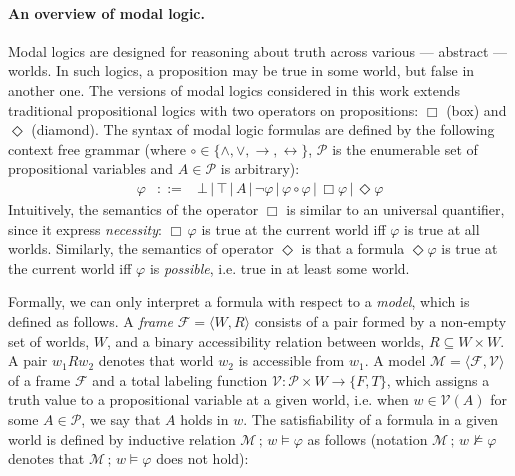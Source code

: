 \documentclass[sigconf]{acmart}
\begin{document}
\paragraph{An overview of modal logic.} Modal logics are designed for reasoning
about truth across various --- abstract --- worlds. In such logics, a
proposition may be true in some world, but false in another one. The versions of
modal logics considered in this work extends traditional propositional logics
with two operators on propositions: $\Box$ (box) and $\Diamond$ (diamond).
The syntax of modal logic formulas are defined by the following context free
grammar (where $\circ \in\{\land,\lor,\to,\leftrightarrow\}$, $\mathcal{P}$ is
the enumerable set of propositional variables and $A\in\mathcal{P}$ is arbitrary):
\[
  \begin{array}{lcl}
    \varphi & ::= & \bot\,|\,\top\,|\,A\,|\,\neg\varphi\,|\,\varphi\circ\varphi\,|\,\Box\varphi\,|\,\Diamond\varphi
  \end{array}  
\]
Intuitively, the semantics of the operator $\Box$ is similar to an universal
quantifier, since it express \emph{necessity}: $\Box\,\varphi$ is true at the
current world iff $\varphi$ is true at all worlds. Similarly, the semantics of operator
$\Diamond$ is that a formula $\Diamond\varphi$ is true at the current
world iff $\varphi$ is \emph{possible}, i.e. true in at least some world.

Formally, we can only interpret a formula with respect to a \emph{model}, which is
defined as follows.
A \emph{frame} $\mathcal{F} = \langle W, R \rangle$ consists of a pair formed by
a non-empty set of worlds, $W$, and a binary accessibility relation between
worlds, $R \subseteq W \times W$. A pair $w_1Rw_2$ denotes that world $w_2$ is
accessible from $w_1$. A model $\mathcal{M} = \langle \mathcal{F}, \mathcal{V} \rangle$
of a frame $\mathcal{F}$ and a total labeling function
$\mathcal{V} : \mathcal{P}\times W\to \{F,T\}$, which assigns
a truth value to a propositional variable at a given world, i.e. when $w \in \mathcal{V}(A)$
for some $A \in\mathcal{P}$, we say that $A$ holds in $w$. The satisfiability of a formula
in a given world is defined by inductive relation $\mathcal{M}\,;\,w\models \varphi$ as
follows (notation $\mathcal{M}\,;\,w\not\models \varphi$ denotes
that $\mathcal{M}\,;\,w\models \varphi$ does not hold):
\end{document}
